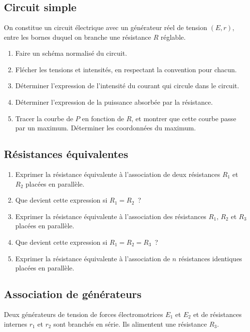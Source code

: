\documentclass[../../main/main.tex]{subfiles}
\begin{document}
\setcounter{chapter}{1}

\chapter{}

\section{Circuit simple}
On constitue un circuit électrique avec un générateur réel de tension $(E,r)$,
entre les bornes duquel on branche une résistance $R$ réglable.

\begin{enumerate}
	\item Faire un schéma normalisé du circuit.
	\item Flécher les tensions et intensités, en respectant la convention pour
	      chacun.
	\item Déterminer l'expression de l'intensité du courant qui circule dans le
	      circuit.
	\item Déterminer l'expression de la puissance absorbée par la résistance.
	\item Tracer la courbe de $P$ en fonction de $R$, et montrer que cette
	      courbe passe par un maximum. Déterminer les coordonnées du maximum.
\end{enumerate}

\section{Résistances équivalentes}
\begin{enumerate}
	\item Exprimer la résistance équivalente à l'association de deux résistances
	      $R_1$ et $R_2$ placées en parallèle.
	\item Que devient cette expression si $R_1 = R_2$~?
	\item Exprimer la résistance équivalente à l'association des résistances
	      $R_1$, $R_2$ et $R_3$ placées en parallèle.
	\item Que devient cette expression si $R_1 = R_2 = R_3$~?
	\item Exprimer la résistance équivalente à l'association de $n$ résistances
	      identiques placées en parallèle.
\end{enumerate}

\section{Association de générateurs}
Deux générateurs de tension de forces électromotrices $E_1$ et $E_2$ et de
résistances internes $r_1$ et $r_2$ sont branchés en série. Ils alimentent une
résistance $R_3$.
\end{document}
